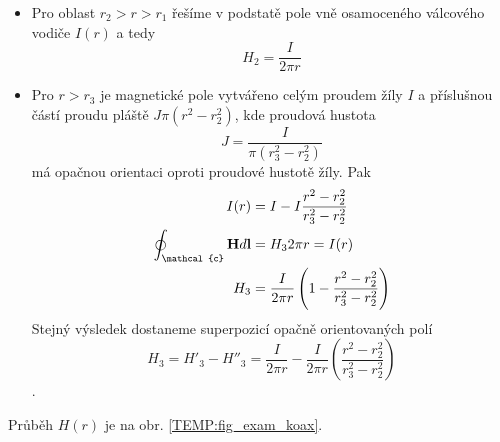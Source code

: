 \begin{mdframed}[style=mdexam]
\begin{example}
\begin{itemize}
      \item Pro oblast $r_2>r>r_1$ řešíme v podstatě pole vně osamoceného válcového vodiče $I(r)$ a
            tedy $$H_2 = \frac{I}{2\pi r}$$
      \item Pro $r>r_3$ je magnetické pole vytvářeno celým proudem žíly $I$ a příslušnou částí
            proudu pláště $J\pi(r^2 - r_2^2)$, kde proudová hustota $$J =
            \frac{I}{\pi(r_3^2-r_2^2)}$$ má opačnou orientaci oproti proudové hustotě žíly. Pak 
            \begin{align*}
              I(r)                             &= I - I\frac{r^2-r_2^2}{r_3^2-r_2^2} \\
              \oint_{\mathcal{c}}\vr{H}d\vr{l} &= H_32\pi r = I(r)                   \\          
              H_3                              &= \frac{I}{2\pi r}\left(1 - 
              \frac{r^2 - r_2^2}{r_3^2 - r_2^2}\right) 
            \end{align*}
            Stejný výsledek dostaneme superpozicí opačně orientovaných polí
            $$H_3 = H'_3 - H''_3 = \frac{I}{2\pi r} - \frac{I}{2\pi r}\left(\frac{r^2 - r_2^2}{r_3^2
            - r_2^2}\right)$$. 
    \end{itemize}
    Průběh $H(r)$ je na obr. \ref{TEMP:fig_exam_koax}.
  \end{example}
\end{mdframed}